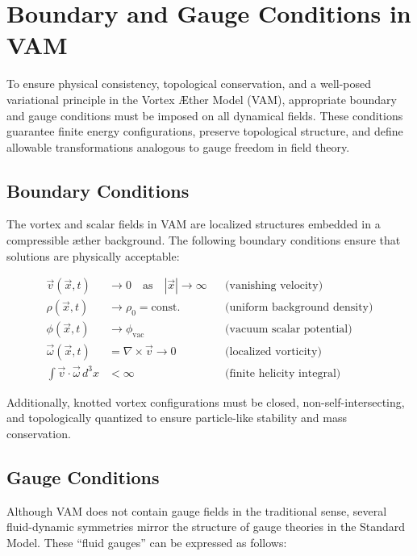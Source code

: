 \section{Boundary and Gauge Conditions in VAM}

To ensure physical consistency, topological conservation, and a well-posed variational principle in the Vortex Æther Model (VAM), appropriate boundary and gauge conditions must be imposed on all dynamical fields. These conditions guarantee finite energy configurations, preserve topological structure, and define allowable transformations analogous to gauge freedom in field theory.

\subsection{Boundary Conditions}

The vortex and scalar fields in VAM are localized structures embedded in a compressible æther background. The following boundary conditions ensure that solutions are physically acceptable:

\begin{align*}
    \vec{v}(\vec{x}, t) &\rightarrow 0 \quad \text{as} \quad |\vec{x}| \rightarrow \infty && \text{(vanishing velocity)} \\
    \rho(\vec{x}, t) &\rightarrow \rho_0 = \text{const.} && \text{(uniform background density)} \\
    \phi(\vec{x}, t) &\rightarrow \phi_{\text{vac}} && \text{(vacuum scalar potential)} \\
    \vec{\omega}(\vec{x}, t) &= \nabla \times \vec{v} \rightarrow 0 && \text{(localized vorticity)} \\
    \int \vec{v} \cdot \vec{\omega} \, d^3x &< \infty && \text{(finite helicity integral)}
\end{align*}

Additionally, knotted vortex configurations must be closed, non-self-intersecting, and topologically quantized to ensure particle-like stability and mass conservation.

\subsection{Gauge Conditions}

Although VAM does not contain gauge fields in the traditional sense, several fluid-dynamic symmetries mirror the structure of gauge theories in the Standard Model. These “fluid gauges” can be expressed as follows:

